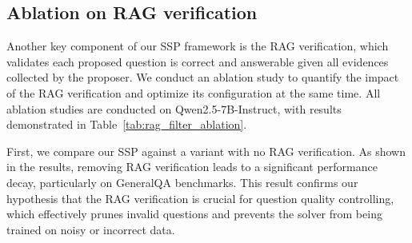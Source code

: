\documentclass[10pt, a4paper, logo]{googledeepmind} %
\begin{document}
\vspace{-1mm}
\subsection{Ablation on RAG verification}
\label{sec:rag_filter_ablation}
\vspace{-1mm}

Another key component of our SSP framework is the RAG verification, which validates each proposed question is correct and answerable given all evidences collected by the proposer. We conduct an ablation study to quantify the impact of the RAG verification and optimize its configuration at the same time. All ablation studies are conducted on Qwen2.5-7B-Instruct, with results demonstrated in Table~\ref{tab:rag_filter_ablation}.



First, we compare our SSP against a variant with no RAG verification. As shown in the results, removing RAG verification leads to a significant performance decay, particularly on GeneralQA benchmarks. This result confirms our hypothesis that the RAG verification is crucial for question quality controlling, which effectively prunes invalid questions %
and prevents the solver from being trained on noisy or incorrect data.
\end{document}

